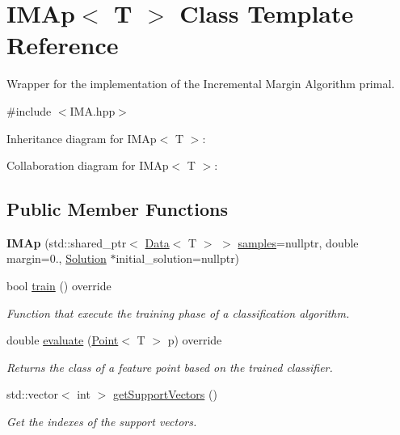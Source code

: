 \hypertarget{class_i_m_ap}{}\section{I\+M\+Ap$<$ T $>$ Class Template Reference}
\label{class_i_m_ap}


Wrapper for the implementation of the Incremental Margin Algorithm primal.  




{\ttfamily \#include $<$I\+M\+A.\+hpp$>$}



Inheritance diagram for I\+M\+Ap$<$ T $>$\+:


Collaboration diagram for I\+M\+Ap$<$ T $>$\+:
\subsection*{Public Member Functions}
\begin{DoxyCompactItemize}
\item 
\mbox{\label{class_i_m_ap_a54d31e0bcbb062d224a40fdb3a9fcdcd}} 
{\bfseries I\+M\+Ap} (std\+::shared\+\_\+ptr$<$ \mbox{\hyperlink{class_data}{Data}}$<$ T $>$ $>$ \mbox{\hyperlink{class_classifier_a0000b47a2e0784ada4c52d7046c4adb8}{samples}}=nullptr, double margin=0., \mbox{\hyperlink{class_solution}{Solution}} $\ast$initial\+\_\+solution=nullptr)
\item 
bool \mbox{\hyperlink{class_i_m_ap_aa8bf6b0d21a76d388fe81ee516b627e4}{train}} () override
\begin{DoxyCompactList}\small\item\em Function that execute the training phase of a classification algorithm. \end{DoxyCompactList}\item 
double \mbox{\hyperlink{class_i_m_ap_a41b0739cdc486e3f21e7927f1ad429a8}{evaluate}} (\mbox{\hyperlink{class_point}{Point}}$<$ T $>$ p) override
\begin{DoxyCompactList}\small\item\em Returns the class of a feature point based on the trained classifier. \end{DoxyCompactList}\item 
std\+::vector$<$ int $>$ \mbox{\hyperlink{class_i_m_ap_a87adda768f1c48c0e4fcdf66f3145ae9}{get\+Support\+Vectors}} ()
\begin{DoxyCompactList}\small\item\em Get the indexes of the support vectors. \end{DoxyCompactList}\end{DoxyCompactItemize}
